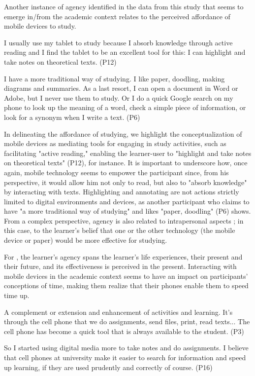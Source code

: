 Another instance of agency identified in the data from this study that seems to emerge in/from the academic context relates to the perceived affordance of mobile devices to study.

I usually use my tablet to study because I absorb knowledge through active reading and I find the tablet to be an excellent tool for this: I can highlight and take notes on theoretical texts. (P12)

I have a more traditional way of studying. I like paper, doodling, making diagrams and summaries. As a last resort, I can open a document in Word or Adobe, but I never use them to study. Or I do a quick Google search on my phone to look up the meaning of a word, check a simple piece of information, or look for a synonym when I write a text. (P6)

In delineating the affordance of studying, we highlight the conceptualization of mobile devices as mediating tools for engaging in study activities, such as facilitating "active reading," enabling the learner-user to "highlight and take notes on theoretical texts" (P12), for instance. It is important to underscore how, once again, mobile technology seems to empower the participant since, from his perspective, it would allow him not only to read, but also to "absorb knowledge" by interacting with texts. Highlighting and annotating are not actions strictly limited to digital environments and devices, as another participant who claims to have "a more traditional way of studying" and likes "paper, doodling" (P6) shows. From a complex perspective, agency is also related to intrapersonal aspects \cite{mercer2012}; in this case, to the learner's belief that one or the other technology (the mobile device or paper) would be more effective for studying.

For \textcite{larsen2019}, the learner's agency spans the learner's life experiences, their present and their future, and its effectiveness is perceived in the present. Interacting with mobile devices in the academic context seems to have an impact on participants' conceptions of time, making them realize that their phones enable them to speed time up.

A complement or extension and enhancement of activities and learning. It's through the cell phone that we do assignments, send files, print, read texts... The cell phone has become a quick tool that is always available to the student. (P3)

So I started using digital media more to take notes and do assignments. I believe that cell phones at university make it easier to search for information and speed up learning, if they are used prudently and correctly of course. (P16)

